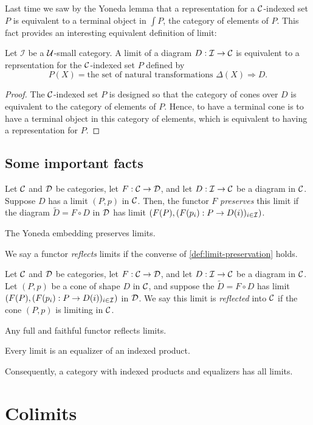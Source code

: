 Last time we saw by the Yoneda lemma that a representation for a \(\mathcal C\)-indexed set \(P\)
is equivalent to a terminal object in \(\int P\), the category of elements of \(P\).
This fact provides an interesting equivalent definition of limit:
\begin{proposition}
  Let \(\mathcal I\) be a \(\mathcal U\)-small category.
  A limit of a diagram \(D : \mathcal I \to \mathcal C\)
  is equivalent to a reprsentation for the \(\mathcal C\)-indexed set \(P\) defined by
  \[
     P(X) = \text{the set of natural transformations }\Delta(X) \Rightarrow D.
  \]
\end{proposition}
\begin{proof}
  The \(\mathcal C\)-indexed set \(P\) is designed so that
  the category of cones over \(D\) is equivalent to the category of elements of \(P\).
  Hence, to have a terminal cone is to have a terminal object in this category of elements,
which is equivalent to having a representation for \(P\).
\end{proof}


\subsection{Some important facts}

\begin{definition} \label{def:limit-preservation}
  \sloppy
  Let $\mathcal C$ and $\mathcal D$ be categories, let $F : \mathcal C \to \mathcal D$,
  and let $D : \mathcal I \to \mathcal C$ 
  be a diagram in $\mathcal C$. 
  Suppose $D$ has a limit $(P,p)$ in $\mathcal C$. Then,
  the functor $F$ \emph{preserves} this limit
  if
  the diagram $\tilde{D} = F \circ D$ in $\mathcal D$
  has limit
  $(F(P), (F(p_i) : P \to D(i))_{i\in \mathcal I})$.
\end{definition}

\begin{proposition}
  The Yoneda embedding preserves limits.
\end{proposition}

We say a functor \emph{reflects} limits if the converse of \cref{def:limit-preservation} holds.

\begin{definition}
  \sloppy
  Let $\mathcal C$ and $\mathcal D$ be categories, let $F : \mathcal C \to \mathcal D$,
  and let $D : \mathcal I \to \mathcal C$
  be a diagram in $\mathcal C$.
  Let \((P,p)\) be a cone of shape \(D\) in \(\mathcal C\),
  and suppose the $\tilde{D} = F \circ D$
  has limit $(F(P), (F(p_i) : P \to D(i))_{i\in \mathcal I})$ in \(\mathcal D\).
  We say this limit is \emph{reflected} into \(\mathcal C\)
  if the cone $(P,p)$ is limiting in $\mathcal C$.
\end{definition}

\begin{proposition}
  Any full and faithful functor reflects limits.
\end{proposition}

\begin{proposition}
  Every limit is an equalizer of an indexed product.
\end{proposition}
Consequently, a category with indexed products and equalizers has all limits.

\section{Colimits}
